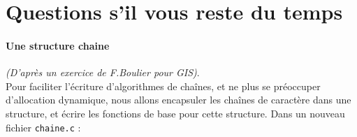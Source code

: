 \documentclass[final, pdftex, a4paper, openbib, ]{article}
\newcommand{\codes}{../codes/TP3}
\begin{document}
%

\section{Questions s’il vous reste du temps}

\paragraph{Une structure chaine} \textit{(D'après un exercice de F.Boulier pour GIS)}.\\Pour faciliter l'écriture d'algorithmes
de chaînes, et ne plus se préoccuper d'allocation dynamique, nous allons encapsuler les chaînes de
caractère dans une structure, et écrire les fonctions de base pour cette structure.
Dans un nouveau fichier \texttt{chaine.c} :
\end{document}
